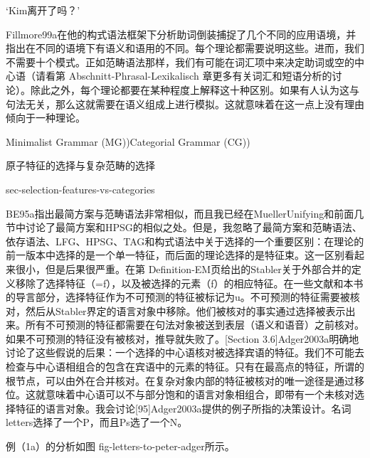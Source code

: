 `Kim离开了吗？'

Fillmore99a在他的构式语法框架下分析助词倒装捕捉了几个不同的应用语境，并指出在不同的语境下有语义和语用的不同。每个理论都需要说明这些。进而，我们不需要十个模式。正如范畴语法那样，我们有可能在词汇项中来决定助词或空的中心语（请看第 Abschnitt-Phrasal-Lexikalisch 章更多有关词汇和短语分析的讨论）。除此之外，每个理论都要在某种程度上解释这十种区别。如果有人认为这与句法无关，那么这就需要在语义组成上进行模拟。这就意味着在这一点上没有理由倾向于一种理论。








Minimalist Grammar (MG))Categorial Grammar (CG))


原子特征的选择与复杂范畴的选择

sec-selection-features-vs-categories

BE95a指出最简方案与范畴语法非常相似，而且我已经在MuellerUnifying和前面几节中讨论了最简方案和HPSG的相似之处。但是，我忽略了最简方案和范畴语法、依存语法、LFG、HPSG、TAG和构式语法中关于选择的一个重要区别：在理论的前一版本中选择的是一个单一特征，而后面的理论选择的是特征束。这一区别看起来很小，但是后果很严重。在第 Definition-EM页给出的Stabler关于外部合并的定义移除了选择特征（=f），以及被选择的元素（f）的相应特征。在一些文献和本书的导言部分，选择特征作为不可预测的特征被标记为u。不可预测的特征需要被核对，然后从Stabler界定的语言对象中移除。他们被核对的事实通过选择被表示出来。所有不可预测的特征都需要在句法对象被送到表层（语义和语音）之前核对。如果不可预测的特征没有被核对，推导就失败了。[Section 3.6]Adger2003a明确地讨论了这些假说的后果：一个选择的中心语核对被选择宾语的特征。我们不可能去检查与中心语相组合的包含在宾语中的元素的特征。只有在最高点的特征，所谓的根节点，可以由外在合并核对。在复杂对象内部的特征被核对的唯一途径是通过移位。这就意味着中心语可以不与部分饱和的语言对象相组合，即带有一个未核对选择特征的语言对象。我会讨论[95]Adger2003a提供的例子所指的决策设计。名词letters选择了一个P，而且Ps选了一个N。
























例（1a）的分析如图 fig-letters-to-peter-adger所示。



